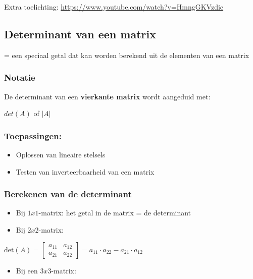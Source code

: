 \documentclass{article}
\begin{document}
Extra toelichting: \url{https://www.youtube.com/watch?v=HmngGKVzdic}

\subsection{Determinant van een matrix}

= een speciaal getal dat kan worden berekend uit de elementen van een matrix

\subsubsection{Notatie}

De determinant van een \textbf{vierkante matrix} wordt aangeduid met:

$det(A)$ of $|A|$

\subsubsection{Toepassingen:}

\begin{itemize}
    \item Oplossen van lineaire stelsels
    \item Testen van inverteerbaarheid van een matrix
\end{itemize}

\subsubsection{Berekenen van de determinant}

\begin{itemize}
    \item Bij $1x1$-matrix: het getal in de matrix = de determinant
    \item Bij $2x2$-matrix: 
\end{itemize}

$\text{det}(A) = \begin{bmatrix}
a_{11} & a_{12}\\
a_{21} & a_{22}
\end{bmatrix} = a_{11} \cdot a_{22} - a_{21}\cdot a_{12}$

\begin{itemize}
    \item Bij een $3x3$-matrix:
\end{itemize}
\end{document}
